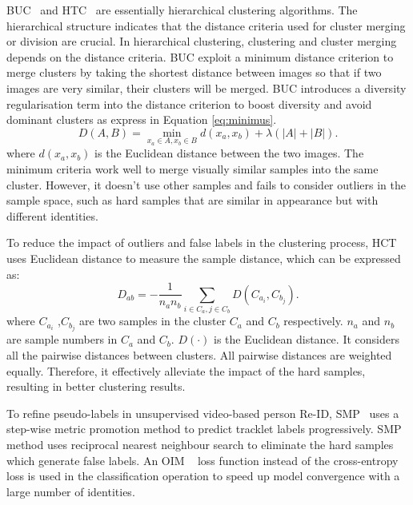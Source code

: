 \documentclass[a4paper,fleqn]{cas-dc}
\begin{document}
BUC~\cite{lin_bottom-up_2019} and HTC~\cite{zeng_hierarchical_2020} are essentially hierarchical clustering algorithms. The hierarchical structure indicates that the distance criteria used for cluster merging or division are crucial. In hierarchical clustering, clustering and cluster merging depends on the distance criteria. BUC exploit a minimum distance criterion to merge clusters by taking the shortest distance between images so that if two images are very similar, their clusters will be merged. BUC introduces a diversity regularisation term into the distance criterion to boost diversity and avoid dominant clusters as express in Equation \ref{eq:minimus}. \begin{equation} \label{eq:minimus}
D(A,B) = \min_{x_a \in A, x_b \in B} d(x_a, x_b) + \lambda(|A| + |B|).
\end{equation}
where $d(x_a, x_b)$ is the Euclidean distance between the two images. The minimum criteria work well to merge visually similar samples into the same cluster. However, it doesn't use other samples and fails to consider outliers in the sample space, such as hard samples that are similar in appearance but with different identities.

To reduce the impact of outliers and false labels in the clustering process,  HCT uses Euclidean distance to measure the sample distance, which can be expressed as: 
\begin{equation} \label{eq:htc}
D_{ab} = -\frac{1}{n_an_b}\sum_{i \in C_a,j \in C_b} D(C_{a_i},C_{b_j}).
\end{equation}
where $C_{a_i}$ ,$C_{b_j}$ are two samples in the cluster $C_a$ and $C_b$ respectively. $n_a$ and $n_b$ are sample numbers in $C_a$ and $C_b$. $D(\cdot)$ is the Euclidean distance. It considers all the pairwise distances between clusters. All pairwise distances are weighted equally. Therefore, it effectively alleviate the impact of the hard samples, resulting in better clustering results.

To refine pseudo-labels in unsupervised video-based person Re-ID, SMP~\cite{liu_stepwise_2017} uses a step-wise metric promotion method to predict tracklet labels progressively. SMP method uses reciprocal nearest neighbour search to eliminate the hard samples which generate false labels. An OIM ~\cite{xiao_joint_2017} loss function instead of the cross-entropy loss is used in the classification operation to speed up model convergence with a large number of identities.
\end{document}
